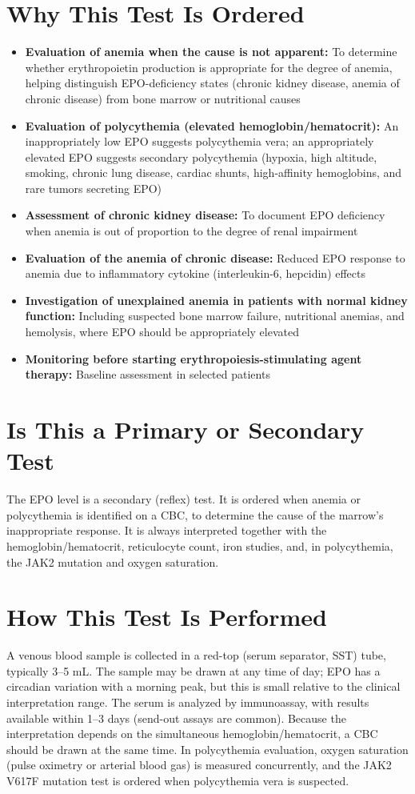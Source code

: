 \section*{Why This Test Is Ordered}
\begin{itemize}
  \item \textbf{Evaluation of anemia when the cause is not apparent:} To determine whether erythropoietin production is appropriate for the degree of anemia, helping distinguish EPO-deficiency states (chronic kidney disease, anemia of chronic disease) from bone marrow or nutritional causes
  \item \textbf{Evaluation of polycythemia (elevated hemoglobin/hematocrit):} An inappropriately low EPO suggests polycythemia vera; an appropriately elevated EPO suggests secondary polycythemia (hypoxia, high altitude, smoking, chronic lung disease, cardiac shunts, high-affinity hemoglobins, and rare tumors secreting EPO)
  \item \textbf{Assessment of chronic kidney disease:} To document EPO deficiency when anemia is out of proportion to the degree of renal impairment
  \item \textbf{Evaluation of the anemia of chronic disease:} Reduced EPO response to anemia due to inflammatory cytokine (interleukin-6, hepcidin) effects
  \item \textbf{Investigation of unexplained anemia in patients with normal kidney function:} Including suspected bone marrow failure, nutritional anemias, and hemolysis, where EPO should be appropriately elevated
  \item \textbf{Monitoring before starting erythropoiesis-stimulating agent therapy:} Baseline assessment in selected patients
\end{itemize}

\section*{Is This a Primary or Secondary Test}
The EPO level is a secondary (reflex) test. It is ordered when anemia or polycythemia is identified on a CBC, to determine the cause of the marrow's inappropriate response. It is always interpreted together with the hemoglobin/hematocrit, reticulocyte count, iron studies, and, in polycythemia, the JAK2 mutation and oxygen saturation.

\section*{How This Test Is Performed}
A venous blood sample is collected in a red-top (serum separator, SST) tube, typically 3--5 mL. The sample may be drawn at any time of day; EPO has a circadian variation with a morning peak, but this is small relative to the clinical interpretation range. The serum is analyzed by immunoassay, with results available within 1--3 days (send-out assays are common). Because the interpretation depends on the simultaneous hemoglobin/hematocrit, a CBC should be drawn at the same time. In polycythemia evaluation, oxygen saturation (pulse oximetry or arterial blood gas) is measured concurrently, and the JAK2 V617F mutation test is ordered when polycythemia vera is suspected.

